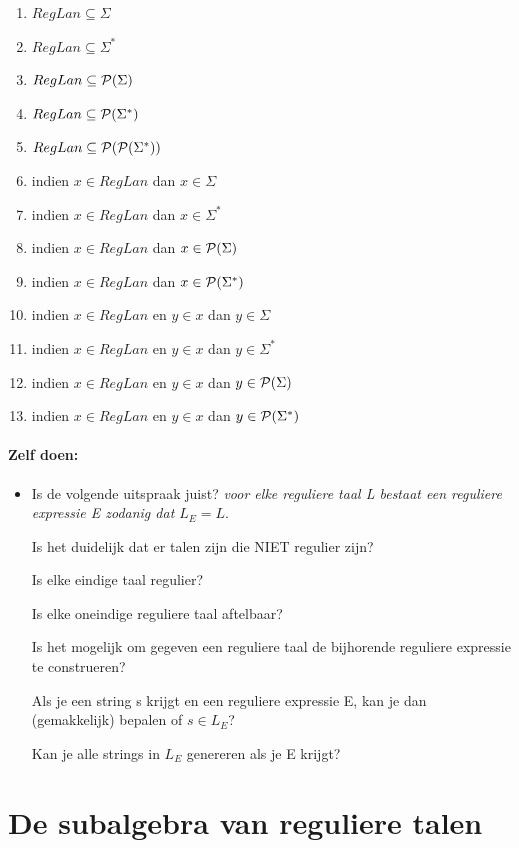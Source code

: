 \begin{enumerate}
\item $RegLan \subseteq \Sigma$
\item $RegLan \subseteq \Sigma^*$
\item $RegLan \subseteq {\cal P}(\Sigma)$
\item $RegLan \subseteq {\cal P}(\Sigma^*)$
\item $RegLan \subseteq {\cal P}({\cal P}(\Sigma^*))$
\item indien $x \in RegLan$ dan $x \in \Sigma$
\item indien $x \in RegLan$ dan $x \in \Sigma^*$
\item indien $x \in RegLan$ dan $x \in {\cal P}(\Sigma)$
\item indien $x \in RegLan$ dan $x \in {\cal P}(\Sigma^*)$
\item indien $x \in RegLan$ en $y \in x$ dan $y \in \Sigma$
\item indien $x \in RegLan$ en $y \in x$ dan $y \in \Sigma^*$
\item indien $x \in RegLan$ en $y \in x$ dan $y \in {\cal P}(\Sigma)$
\item indien $x \in RegLan$ en $y \in x$ dan $y \in {\cal P}(\Sigma^*)$
\end{enumerate}

\paragraph{Zelf doen:}

\begin{itemize}
\item[]
Is de volgende uitspraak juist? {\em voor elke reguliere taal L
bestaat een reguliere expressie E zodanig dat $L_E = L$}.


Is het duidelijk dat er talen zijn die NIET regulier zijn?

Is elke eindige taal regulier?

Is elke oneindige reguliere taal aftelbaar?

Is het mogelijk om gegeven een reguliere taal de bijhorende reguliere
expressie te construeren?

Als je een string s krijgt en een reguliere expressie E, kan je dan
(gemakkelijk) bepalen of $s \in L_E$?

Kan je alle strings in $L_E$ genereren als je E krijgt?
\end{itemize}


\section{De subalgebra van reguliere talen}

